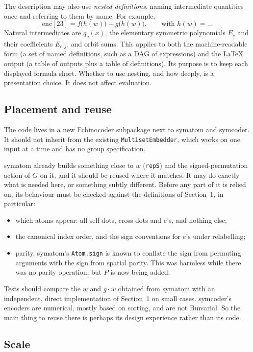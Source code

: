 \documentclass[11pt]{article}
\theoremstyle{definition}
\theoremstyle{remark}
\begin{document}
The description may also use \emph{nested definitions}, naming intermediate
quantities once and referring to them by name. For example,
\[
  \mathrm{enc}[23] = f\bigl(h(w)\bigr) + g\bigl(h(w)\bigr),
  \qquad \text{with } h(w) = \ldots
\]
Natural intermediates are $q_g(x)$, the elementary symmetric polynomials
$E_c$ and their coefficients $E_{c,j}$, and orbit sums. This applies to both
the machine-readable form (a set of named definitions, such as a DAG of
expressions) and the LaTeX output (a table of outputs plus a table of
definitions). Its purpose is to keep each displayed formula short. Whether to
use nesting, and how deeply, is a presentation choice. It does not affect
evaluation.

\subsection{Placement and reuse}

The code lives in a new Echinocoder subpackage next to symatom and symcoder.
It should not inherit from the existing \texttt{MultisetEmbedder}, which works
on one input at a time and has no group specification.

symatom already builds something close to $w$ (\texttt{repS}) and the
signed-permutation action of $G$ on it, and it should be reused where it
matches. It may do exactly what is needed here, or something subtly
different. Before any part of it is relied on, its behaviour must be checked
against the definitions of Section~1, in particular:
\begin{itemize}
  \item which atoms appear: all self-dots, cross-dots and $e$'s, and nothing
    else;
  \item the canonical index order, and the sign conventions for $e$'s under
    relabelling;
  \item parity. symatom's \texttt{Atom.sign} is known to conflate the sign
    from permuting arguments with the sign from spatial parity. This was
    harmless while there was no parity operation, but $P$ is now being added.
\end{itemize}
Tests should compare the $w$ and $g \cdot w$ obtained from symatom with an
independent, direct implementation of Section~1 on small cases. symcoder's
encoders are numerical, mostly based on sorting, and are not Bursarial. So
the main thing to reuse there is perhaps its design experience rather than
its code.

\subsection{Scale}
\end{document}
